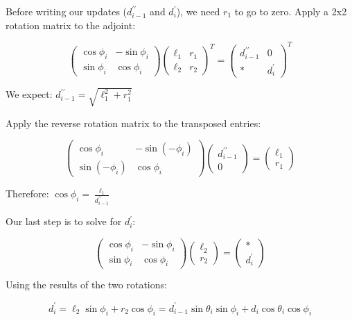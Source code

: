 \documentclass{article}
\begin{document}
Before writing our updates ($d_{i-1}^{\prime\prime}$ and $d_i^\prime$), we need $r_1$ to go to zero. Apply a 2x2 rotation matrix to the adjoint:

$$
\left(\begin{matrix}
	\cos \phi_i & -\sin\phi_i \\
	\sin\phi_i & \cos\phi_i
\end{matrix}
\right)
\left(\begin{matrix}
	\ell_1 & r_1 \\ \ell_2 & r_2
\end{matrix}\right)^T
=
\left(\begin{matrix}
	d_{i-1}^{\prime\prime}
	&
	0
	\\
	* & d_i^\prime
\end{matrix}\right)^T
$$

We expect: $d_{i-1}^{\prime\prime} = \sqrt{\ell_1^2 + r_1^2}$

Apply the reverse rotation matrix to the transposed entries:

$$
\left(\begin{matrix}
	\cos \phi_i & -\sin(-\phi_i) \\
	\sin(-\phi_i) & \cos\phi_i
\end{matrix}
\right)
\left(\begin{matrix} d_{i-1}^{\prime\prime
	}
\\ 0 \end{matrix}\right)
=
\left(\begin{matrix}
	\ell_1 \\ r_1 \end{matrix}\right)
$$

Therefore: $\cos\phi_i = \frac{\ell_1}{d_{i-1}^{\prime\prime}}$

Our last step is to solve for $d_i^\prime$:

$$
\left(\begin{matrix}
	\cos \phi_i & -\sin\phi_i \\
	\sin\phi_i & \cos\phi_i
\end{matrix}
\right)
\left( \begin{matrix} \ell_2 \\ r_2 \end{matrix}\right)
=
\left( \begin{matrix} * \\ d_i^\prime \end{matrix} \right)
$$

Using the results of the two rotations:

$$
d_i^\prime =
\ell_2 \sin\phi_i + r_2 \cos\phi_i =
d_{i-1}^\prime \sin\theta_i \sin\phi_i + d_i \cos\theta_i \cos\phi_i
$$
\end{document}
